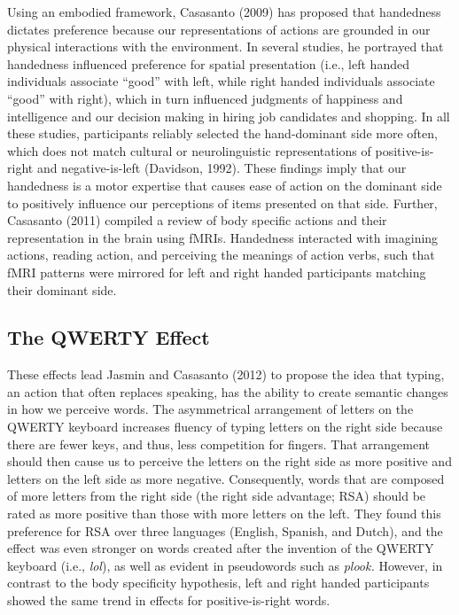 \documentclass[english,man, mask]{apa6}
\theoremstyle{definition}
\theoremstyle{definition}
\theoremstyle{definition}
\theoremstyle{remark}
\begin{document}
Using an embodied framework, Casasanto (2009) has proposed that
handedness dictates preference because our representations of actions
are grounded in our physical interactions with the environment. In
several studies, he portrayed that handedness influenced preference for
spatial presentation (i.e., left handed individuals associate
\enquote{good} with left, while right handed individuals associate
\enquote{good} with right), which in turn influenced judgments of
happiness and intelligence and our decision making in hiring job
candidates and shopping. In all these studies, participants reliably
selected the hand-dominant side more often, which does not match
cultural or neurolinguistic representations of positive-is-right and
negative-is-left (Davidson, 1992). These findings imply that our
handedness is a motor expertise that causes ease of action on the
dominant side to positively influence our perceptions of items presented
on that side. Further, Casasanto (2011) compiled a review of body
specific actions and their representation in the brain using fMRIs.
Handedness interacted with imagining actions, reading action, and
perceiving the meanings of action verbs, such that fMRI patterns were
mirrored for left and right handed participants matching their dominant
side.

\subsection{The QWERTY Effect}\label{the-qwerty-effect}

These effects lead Jasmin and Casasanto (2012) to propose the idea that
typing, an action that often replaces speaking, has the ability to
create semantic changes in how we perceive words. The asymmetrical
arrangement of letters on the QWERTY keyboard increases fluency of
typing letters on the right side because there are fewer keys, and thus,
less competition for fingers. That arrangement should then cause us to
perceive the letters on the right side as more positive and letters on
the left side as more negative. Consequently, words that are composed of
more letters from the right side (the right side advantage; RSA) should
be rated as more positive than those with more letters on the left. They
found this preference for RSA over three languages (English, Spanish,
and Dutch), and the effect was even stronger on words created after the
invention of the QWERTY keyboard (i.e., \emph{lol}), as well as evident
in pseudowords such as \emph{plook.} However, in contrast to the body
specificity hypothesis, left and right handed participants showed the
same trend in effects for positive-is-right words.
\end{document}
